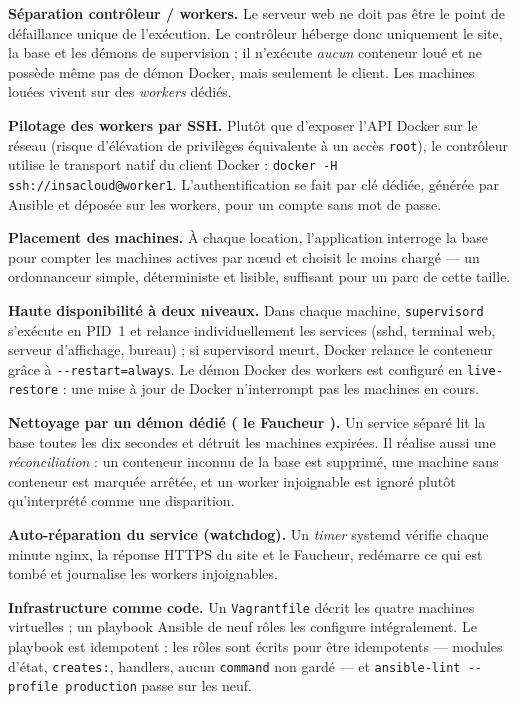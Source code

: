\documentclass[11pt,a4paper]{article}
\begin{document}
\textbf{Séparation contrôleur / workers.} Le serveur web ne doit pas être le point de défaillance
unique de l'exécution. Le contrôleur héberge donc uniquement le site, la base et les démons de
supervision ; il n'exécute \emph{aucun} conteneur loué et ne possède même pas de démon Docker, mais
seulement le client. Les machines louées vivent sur des \emph{workers} dédiés.

\textbf{Pilotage des workers par SSH.} Plutôt que d'exposer l'API Docker sur le réseau (risque
d'élévation de privilèges équivalente à un accès \texttt{root}), le contrôleur utilise le transport
natif du client Docker : \texttt{docker -H ssh://insacloud@worker1}. L'authentification se fait par
clé dédiée, générée par Ansible et déposée sur les workers, pour un compte sans mot de passe.

\textbf{Placement des machines.} À chaque location, l'application interroge la base pour compter les
machines actives par n\oe{}ud et choisit le moins chargé --- un ordonnanceur simple, déterministe et
lisible, suffisant pour un parc de cette taille.

\textbf{Haute disponibilité à deux niveaux.} Dans chaque machine, \texttt{supervisord} s'exécute en
PID~1 et relance individuellement les services (sshd, terminal web, serveur d'affichage, bureau) ;
si supervisord meurt, Docker relance le conteneur grâce à \texttt{-{}-restart=always}. Le démon Docker
des workers est configuré en \texttt{live-restore} : une mise à jour de Docker n'interrompt pas les
machines en cours.

\textbf{Nettoyage par un démon dédié (\og{} le Faucheur \fg{}).} Un service séparé lit la base toutes les dix
secondes et détruit les machines expirées. Il réalise aussi une \emph{réconciliation} : un conteneur
inconnu de la base est supprimé, une machine sans conteneur est marquée arrêtée, et un worker
injoignable est ignoré plutôt qu'interprété comme une disparition.

\textbf{Auto-réparation du service (watchdog).} Un \emph{timer} systemd vérifie chaque minute nginx,
la réponse HTTPS du site et le Faucheur, redémarre ce qui est tombé et journalise les workers
injoignables.

\textbf{Infrastructure comme code.} Un \texttt{Vagrantfile} décrit les quatre machines virtuelles ;
un playbook Ansible de neuf rôles les configure intégralement. Le playbook est idempotent :
les rôles sont écrits pour être idempotents --- modules d'état, \texttt{creates:}, handlers,
aucun \texttt{command} non gardé --- et \texttt{ansible-lint -{}-profile production} passe sur les neuf.
\end{document}
